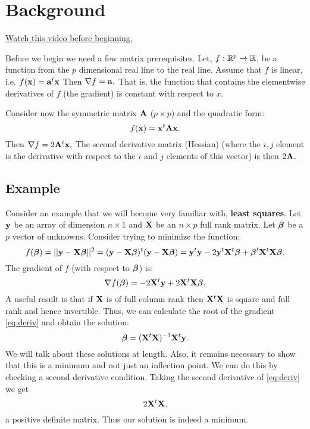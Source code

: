 \chapter{Background}
\label{chap:background}

\href{https://www.youtube.com/watch?v=TrZdG642M4g&index=1&list=PLpl-gQkQivXhdgUCdaUQcdb31CRe8Mm2y}{Watch this video before beginning.}

Before we begin we need a few matrix prerequisites. Let,
$f: \mathbb{R}^p \rightarrow \mathbb{R}$,
be a function from the $p$ dimensional real line to the real line.
Assume that $f$ is linear, i.e. $f(\mathbf{x}) = \mathbf{a}^t \mathbf{x}$
Then $ \nabla f = \mathbf{a}.$ That is, the function that
contains the elementwise derivatives of $f$ (the gradient)
is constant with respect to $x$. 

Consider now the symmetric matrix $\mathbf{A}$
($p\times p$) and the quadratic form:
$$
f(\mathbf{x}) =  \mathbf{x}^t \mathbf{A} \mathbf{x}.
$$
Then  $ \nabla f = 2 \mathbf{A}^t \mathbf{x}.$ The second derivative matrix (Hessian)
(where the $i, j$ element is the derivative
with respect to the $i$ and $j$ elements of this vector)
is then $2 \mathbf{A} $.

\section{Example}

Consider an example that we will become very familiar with, {\bf least squares}.
Let $\mathbf{y}$ be an array of dimension $n\times 1$ and 
$\mathbf{X}$ be an $n\times p$ full rank matrix. Let $\boldsymbol{\beta}$ be a
$p$ vector of unknowns. Consider trying to minimize the function:
$$
f(\boldsymbol{\beta}) = ||\mathbf{y} -  \mathbf{X} \boldsymbol{\beta}||^2 = (\mathbf{y} - \mathbf{X} \boldsymbol{\beta} )^t (\mathbf{y} -  \mathbf{X} \boldsymbol{\beta})
= \mathbf{y}^t \mathbf{y} - 2 \mathbf{y}^t \mathbf{X}^t \boldsymbol{\beta} + \boldsymbol{\beta}^t \mathbf{X}^t \mathbf{X} \boldsymbol{\beta}.
$$
The gradient of $f$ (with respect to $\boldsymbol{\beta}$) is:
\begin{equation}
\label{eq:deriv}
\nabla f(\boldsymbol{\beta}) = -2 \mathbf{X}^t \mathbf{y} + 2 \mathbf{X}^t\mathbf{X} \boldsymbol{\beta}.
\end{equation}
A useful result is that if $\mathbf{X}$ is of full column rank then
$\mathbf{X}^t \mathbf{X}$ is square and full rank and hence invertible. Thus, we can
calculate the root of the gradient \eqref{eq:deriv} and obtain the solution:
$$
\boldsymbol{\beta} = (\mathbf{X}^t \mathbf{X})^{-1} \mathbf{X}^t \mathbf{y}. 
$$
We will talk about these solutions at length. Also, it remains
necessary to show that this is a minimum and not just an
inflection point. We can do this by checking a second derivative
condition. Taking the second derivative of \eqref{eq:deriv} we 
get
$$
2 \mathbf{X}^t\mathbf{X},
$$
a positive definite matrix. Thus our solution is indeed a minimum.

